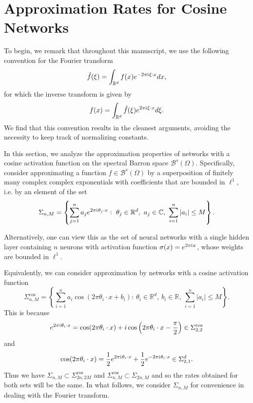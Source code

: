 \section{Approximation Rates for Cosine Networks} 
 
To begin, we remark that throughout this manuscript, we use the following convention for the Fourier transform
\begin{equation}
 \hat{f}(\xi) = \int_{\mathbb{R}^d} f(x)e^{-2\pi {\mathrm{i}\mkern1mu} \xi\cdot x}dx,
\end{equation}
for which the inverse transform is given by
\begin{equation}
 f(x) = \int_{\mathbb{R}^d} \hat{f}(\xi)e^{2\pi {\mathrm{i}\mkern1mu}    \xi\cdot x}d\xi.
\end{equation}
We find that this convention results in the cleanest arguments, avoiding the necessity to keep track of normalizing constants.

In this section, we analyze the approximation properties of networks with a cosine activation function on the spectral Barron space $\mathcal{B}^s(\Omega)$. Specifically, consider approximating a function $f\in \mathcal{B}^s(\Omega)$ by a superposition of finitely many complex complex exponentials with coefficients that are bounded in $\ell^1$, i.e. by an element of the set
\begin{equation}
 \Sigma_{n,M} = \left\{\sum_{j=1}^n a_je^{2\pi {\mathrm{i}\mkern1mu}  \theta_j\cdot x}:~\theta_j\in \mathbb{R}^d,~a_j\in\mathbb{C},~\sum_{i=1}^n|a_i|\leq M\right\}.
\end{equation}

Alternatively, one can view this as the set of neural networks with a single hidden layer containing $n$ neurons with activation function $\sigma(x) = e^{2\pi {\mathrm{i}\mkern1mu}  x}$, whose weights are bounded in $\ell^1$.

Equivalently, we can consider approximation by networks with a cosine activation function
\begin{equation}
  \Sigma^{\cos}_{n,M} = \left\{\sum_{i=1}^n a_i\cos(2\pi\theta_i\cdot x + b_i):~\theta_i\in \mathbb{R}^d,~b_i\in \mathbb{R},~\sum_{i=1}^n|a_i| \leq M\right\}.
 \end{equation}
This is because 
\begin{equation}
e^{2\pi {\mathrm{i}\mkern1mu}  \theta_i\cdot x} = \cos(2\pi\theta_i\cdot x) + i\cos\left(2\pi\theta_i\cdot x - \frac{\pi}{2}\right)\in \Sigma^{\cos}_{2,2}
\end{equation}
and
\begin{equation}
 \cos(2\pi\theta_i\cdot x) = \frac{1}{2}e^{2\pi {\mathrm{i}\mkern1mu}  \theta_i\cdot x} + \frac{1}{2}e^{-2\pi {\mathrm{i}\mkern1mu}  \theta_i\cdot x}\in \Sigma^d_{2,1}.
\end{equation}
Thus we have $\Sigma_{n,M}\subset \Sigma^{\cos}_{2n,2M}$ and $\Sigma^{\cos}_{n,M} \subset \Sigma_{2n,M}$ and so the rates obtained for both sets will be the same. In what follows, we consider $\Sigma_{n,M}$ for convenience in dealing with the Fourier transform.
 
